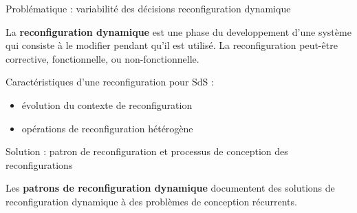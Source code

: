 \begin{frame}{Problématique : variabilité des décisions reconfiguration dynamique}
\begin{block}{}
La \textbf{reconfiguration dynamique} est une phase du
developpement d'une système qui consiste à le modifier pendant qu’il est
utilisé. La reconfiguration peut-être corrective, fonctionnelle,  ou
non-fonctionnelle.
\end{block}
\begin{figure}

\end{figure}

Caractéristiques d'une reconfiguration pour SdS : 
\begin{itemize}
\item évolution du contexte de reconfiguration
\item opérations de reconfiguration hétérogène
\end{itemize}
\end{frame}
%
\begin{frame}{Solution : patron de reconfiguration et processus de
conception des reconfigurations}
\begin{figure}

\end{figure}
\begin{block}{}
Les \textbf{patrons de reconfiguration dynamique} documentent des solutions de
reconfiguration dynamique à des problèmes de conception récurrents.
\end{block}
\end{frame}



